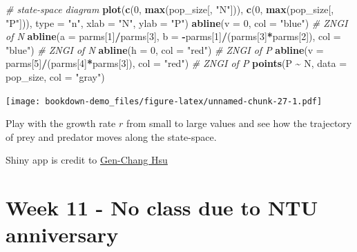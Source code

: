 \documentclass[
]{book}
\newenvironment{Shaded}{\begin{snugshade}}{\end{snugshade}}
\newcommand{\AttributeTok}[1]{\textcolor[rgb]{0.13,0.29,0.53}{#1}}
\newcommand{\CommentTok}[1]{\textcolor[rgb]{0.56,0.35,0.01}{\textit{#1}}}
\newcommand{\DecValTok}[1]{\textcolor[rgb]{0.00,0.00,0.81}{#1}}
\newcommand{\FunctionTok}[1]{\textcolor[rgb]{0.13,0.29,0.53}{\textbf{#1}}}
\newcommand{\NormalTok}[1]{#1}
\newcommand{\SpecialCharTok}[1]{\textcolor[rgb]{0.81,0.36,0.00}{\textbf{#1}}}
\newcommand{\StringTok}[1]{\textcolor[rgb]{0.31,0.60,0.02}{#1}}
\begin{document}
\begin{Shaded}
\begin{Highlighting}[]
\CommentTok{\# state{-}space diagram}
\FunctionTok{plot}\NormalTok{(}\FunctionTok{c}\NormalTok{(}\DecValTok{0}\NormalTok{, }\FunctionTok{max}\NormalTok{(pop\_size[, }\StringTok{"N"}\NormalTok{])), }\FunctionTok{c}\NormalTok{(}\DecValTok{0}\NormalTok{, }\FunctionTok{max}\NormalTok{(pop\_size[, }\StringTok{"P"}\NormalTok{])), }\AttributeTok{type =} \StringTok{"n"}\NormalTok{, }\AttributeTok{xlab =} \StringTok{"N"}\NormalTok{, }\AttributeTok{ylab =} \StringTok{"P"}\NormalTok{)}
\FunctionTok{abline}\NormalTok{(}\AttributeTok{v =} \DecValTok{0}\NormalTok{, }\AttributeTok{col =} \StringTok{"blue"}\NormalTok{) }\CommentTok{\# ZNGI of N}
\FunctionTok{abline}\NormalTok{(}\AttributeTok{a =}\NormalTok{ parms[}\DecValTok{1}\NormalTok{]}\SpecialCharTok{/}\NormalTok{parms[}\DecValTok{3}\NormalTok{], }\AttributeTok{b =} \SpecialCharTok{{-}}\NormalTok{parms[}\DecValTok{1}\NormalTok{]}\SpecialCharTok{/}\NormalTok{(parms[}\DecValTok{3}\NormalTok{]}\SpecialCharTok{*}\NormalTok{parms[}\DecValTok{2}\NormalTok{]), }\AttributeTok{col =} \StringTok{"blue"}\NormalTok{) }\CommentTok{\# ZNGI of N}
\FunctionTok{abline}\NormalTok{(}\AttributeTok{h =} \DecValTok{0}\NormalTok{, }\AttributeTok{col =} \StringTok{"red"}\NormalTok{) }\CommentTok{\# ZNGI of P}
\FunctionTok{abline}\NormalTok{(}\AttributeTok{v =}\NormalTok{ parms[}\DecValTok{5}\NormalTok{]}\SpecialCharTok{/}\NormalTok{(parms[}\DecValTok{4}\NormalTok{]}\SpecialCharTok{*}\NormalTok{parms[}\DecValTok{3}\NormalTok{]), }\AttributeTok{col =} \StringTok{"red"}\NormalTok{) }\CommentTok{\# ZNGI of P}
\FunctionTok{points}\NormalTok{(P }\SpecialCharTok{\textasciitilde{}}\NormalTok{ N, }\AttributeTok{data =}\NormalTok{ pop\_size, }\AttributeTok{col =} \StringTok{"gray"}\NormalTok{)}
\end{Highlighting}
\end{Shaded}

\texttt{[image: bookdown-demo\_files/figure-latex/unnamed-chunk-27-1.pdf]}

Play with the growth rate \(r\) from small to large values and see how the trajectory of prey and predator moves along the state-space.

Shiny app is credit to \href{https://genchanghsu.github.io/index.html}{Gen-Chang Hsu}

\hypertarget{week-11---no-class-due-to-ntu-anniversary}{%
\chapter*{Week 11 - No class due to NTU anniversary}\label{week-11---no-class-due-to-ntu-anniversary}}
\end{document}
